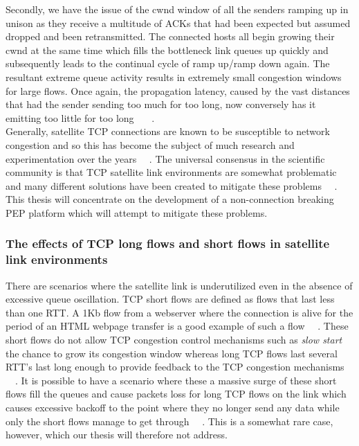 Secondly, we have the issue of the cwnd window of all the senders ramping up in unison as they receive a multitude of ACKs that had been expected but assumed dropped and been retransmitted. The connected hosts all begin growing their cwnd at the same time which fills the bottleneck link queues up quickly and subsequently leads to the continual cycle of ramp up/ramp down again. The resultant extreme queue activity results in extremely small congestion windows for large flows. Once again, the propagation latency, caused by the vast distances that had the sender sending too much for too long, now conversely has it emitting too little for too long ~\cite{5}~\cite{15}~\cite{16}. \\

Generally, satellite TCP connections are known to be susceptible to network congestion and so this has become the subject of much research and experimentation over the years ~\cite{14}~\cite{16}. The universal consensus in the scientific community is that TCP satellite link environments are somewhat problematic and many different solutions have been created to mitigate these problems ~\cite{14}~\cite{16}. This thesis will concentrate on the development of a non-connection breaking PEP platform which will attempt to mitigate these problems.\\

\subsubsection*{The effects of TCP long flows and short flows in satellite link environments}
There are scenarios where the satellite link is underutilized even in the absence of excessive queue oscillation. TCP short flows are defined as flows that last less than one RTT. A 1Kb flow from a webserver where the connection is alive for the period of an HTML webpage transfer is a good example of such a flow ~\cite{5}~\cite{20}. These short flows do not allow TCP congestion control mechanisms such as \emph{slow start} the chance to grow its congestion window whereas long TCP flows last several RTT's last long enough to provide feedback to the TCP congestion mechanisms ~\cite{5}~\cite{20}. It is possible to have a scenario where these a massive surge of these short flows fill the queues and cause packets loss for long TCP flows on the link which causes excessive backoff to the point where they no longer send any data while only the short flows manage to get through ~\cite{5}~\cite{20}. This is a somewhat rare case, however, which our thesis will therefore not address.



